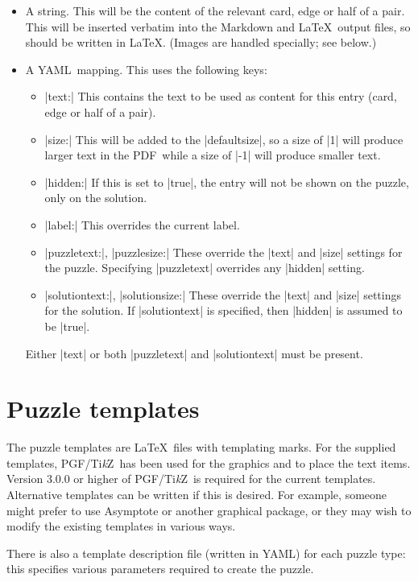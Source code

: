 \documentclass{article}
\def\YAML{{\small YAML}}
\def\PDF{{\small PDF}}
\def\PGF{{\small PGF}}
\def\TikZ{Ti\emph{k}Z}
\begin{document}
\begin{itemize}
\item A string.  This will be the content of the relevant card, edge
  or half of a pair.  This will be inserted verbatim into the Markdown
  and \LaTeX\ output files, so should be written in \LaTeX.  (Images
  are handled specially; see below.)
\item A \YAML\ mapping.  This uses the following keys:
  \begin{itemize}
  \item |text:| This contains the text to be used as content for this
    entry (card, edge or half of a pair).
  \item |size:| This will be added to the |defaultsize|, so a size of
    |1| will produce larger text in the \PDF\, while a size of |-1|
    will produce smaller text.
  \item |hidden:| If this is set to |true|, the entry will not be
    shown on the puzzle, only on the solution.
  \item |label:| This overrides the current label.
  \item |puzzletext:|, |puzzlesize:| These override the |text| and
    |size| settings for the puzzle.  Specifying |puzzletext| overrides
    any |hidden| setting.
  \item |solutiontext:|, |solutionsize:| These override the |text| and
    |size| settings for the solution.  If |solutiontext| is specified,
    then |hidden| is assumed to be |true|.
  \end{itemize}
  Either |text| or both |puzzletext| and |solutiontext| must be
  present.
\end{itemize}



\section{Puzzle templates}
\label{sec:templates}

The puzzle templates are \LaTeX\ files with templating marks.  For the
supplied templates, \PGF/\TikZ\ has been used for the graphics and to
place the text items.  Version 3.0.0 or higher of \PGF/\TikZ\ is
required for the current templates.  Alternative templates can be
written if this is desired.  For example, someone might prefer to use
Asymptote or another graphical package, or they may wish to modify the
existing templates in various ways.

There is also a template description file (written in \YAML) for each
puzzle type: this specifies various parameters required to create the
puzzle.
\end{document}
